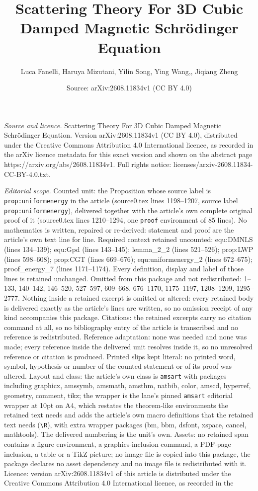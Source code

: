 \documentclass[10pt,a4paper]{amsart}
\title[Scattering Theory For 3D Cubic Damped Magnetic Schr\"odinger]{Scattering Theory For 3D Cubic Damped Magnetic Schr\"odinger Equation}
\author{Luca Fanelli, Haruya Mizutani, Yilin Song, Ying Wang,, Jiqiang Zheng}
\date{Source: arXiv:2608.11834v1 (CC BY 4.0)}
\begin{document}
\maketitle

\noindent\emph{Source and licence.} Scattering Theory For 3D Cubic Damped Magnetic Schr\"odinger Equation. Version arXiv:2608.11834v1 (CC BY 4.0), distributed under the Creative Commons Attribution 4.0 International licence, as recorded in the arXiv licence metadata for this exact version and shown on the abstract page https://arxiv.org/abs/2608.11834v1. Full rights notice: licenses/arxiv-2608.11834-CC-BY-4.0.txt.\par\smallskip

\noindent\textit{Editorial scope.} Counted unit: the Proposition whose source label is \texttt{prop:uniformenergy} in the article (source0.tex lines 1198--1207, source label \texttt{prop:uniformenergy}), delivered together with the article's own complete original proof of it (source0.tex lines 1210--1294, one \texttt{proof} environment of 85 lines). No mathematics is written, repaired or re-derived: statement and proof are the article's own text line for line. Required context retained uncounted: equ:DMNLS (lines 134--139); equ:Gpd (lines 143--145); lemma\_2\_2 (lines 521--526); prop:LWP (lines 598--608); prop:CGT (lines 669--676); equ:uniformenergy\_2 (lines 672--675); proof\_energy\_7 (lines 1171--1174). Every definition, display and label of those lines is retained unchanged. Omitted from this package and not redistributed: 1--133, 140--142, 146--520, 527--597, 609--668, 676--1170, 1175--1197, 1208--1209, 1295--2777. Nothing inside a retained excerpt is omitted or altered: every retained body is delivered exactly as the article's lines are written, so no omission receipt of any kind accompanies this package. Citations: the retained excerpts carry no citation command at all, so no bibliography entry of the article is transcribed and no reference is redistributed. Reference adaptation: none was needed and none was made; every reference inside the delivered unit resolves inside it, so no unresolved reference or citation is produced. Printed slips kept literal: no printed word, symbol, hypothesis or number of the counted statement or of its proof was altered. Layout and class: the article's own class is \texttt{amsart} with packages including graphicx, amssymb, amsmath, amsthm, natbib, color, amscd, hyperref, geometry, comment, tikz; the wrapper is the lane's pinned \texttt{amsart} editorial wrapper at 10pt on A4, which restates the theorem-like environments the retained text needs and adds the article's own macro definitions that the retained text needs (\texttt{\textbackslash R}), with extra wrapper packages (bm, bbm, dsfont, xspace, cancel, mathtools). The delivered numbering is the unit's own. Assets: no retained span contains a figure environment, a graphics-inclusion command, a PDF-page inclusion, a table or a TikZ picture; no image file is copied into this package, the package declares no asset dependency and no image file is redistributed with it. Licence: version arXiv:2608.11834v1 of this article is distributed under the Creative Commons Attribution 4.0 International licence, as recorded in the 
\end{document}
